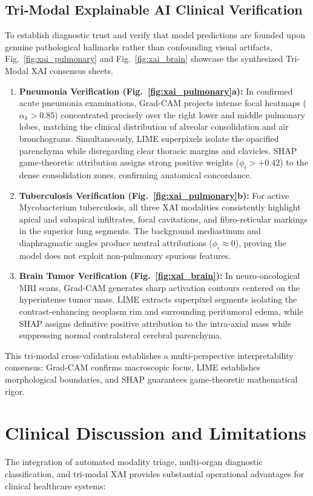 \documentclass[journal]{IEEEtran}
\begin{document}
\subsection{Tri-Modal Explainable AI Clinical Verification}
To establish diagnostic trust and verify that model predictions are founded upon genuine pathological hallmarks rather than confounding visual artifacts, Fig.~\ref{fig:xai_pulmonary} and Fig.~\ref{fig:xai_brain} showcase the synthesized Tri-Modal XAI consensus sheets.

\begin{enumerate}
    \item \textbf{Pneumonia Verification (Fig.~\ref{fig:xai_pulmonary}a):} In confirmed acute pneumonia examinations, Grad-CAM projects intense focal heatmaps ($\alpha_k > 0.85$) concentrated precisely over the right lower and middle pulmonary lobes, matching the clinical distribution of alveolar consolidation and air bronchograms. Simultaneously, LIME superpixels isolate the opacified parenchyma while disregarding clear thoracic margins and clavicles. SHAP game-theoretic attribution assigns strong positive weights ($\phi_i > +0.42$) to the dense consolidation zones, confirming anatomical concordance.
    \item \textbf{Tuberculosis Verification (Fig.~\ref{fig:xai_pulmonary}b):} For active Mycobacterium tuberculosis, all three XAI modalities consistently highlight apical and subapical infiltrates, focal cavitations, and fibro-reticular markings in the superior lung segments. The background mediastinum and diaphragmatic angles produce neutral attributions ($\phi_i \approx 0$), proving the model does not exploit non-pulmonary spurious features.
    \item \textbf{Brain Tumor Verification (Fig.~\ref{fig:xai_brain}):} In neuro-oncological MRI scans, Grad-CAM generates sharp activation contours centered on the hyperintense tumor mass. LIME extracts superpixel segments isolating the contrast-enhancing neoplasm rim and surrounding peritumoral edema, while SHAP assigns definitive positive attribution to the intra-axial mass while suppressing normal contralateral cerebral parenchyma.
\end{enumerate}

This tri-modal cross-validation establishes a multi-perspective interpretability consensus: Grad-CAM confirms macroscopic focus, LIME establishes morphological boundaries, and SHAP guarantees game-theoretic mathematical rigor.

\section{Clinical Discussion and Limitations}
The integration of automated modality triage, multi-organ diagnostic classification, and tri-modal XAI provides substantial operational advantages for clinical healthcare systems:
\end{document}
